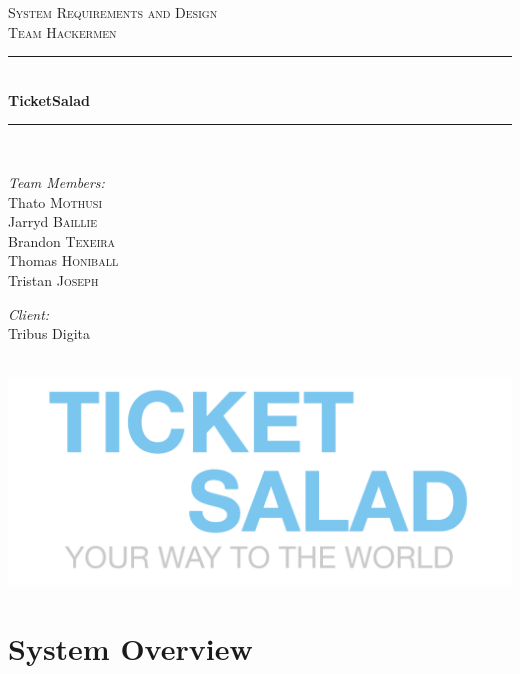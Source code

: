 \documentclass[11pt]{article}
\begin{document}
	\begin{titlepage}
		
		\newcommand{\HRule}{\rule{\linewidth}{0.5mm}} 
		
		\center 
		
		\textsc{\LARGE System Requirements and Design}\\[0.5cm] 
		\textsc{\Large Team Hackermen}\\[0.5cm] 
		
		\HRule \\[0.4cm]
		{ \huge \bfseries TicketSalad}\\[0.4cm] 
		\HRule \\[1.5cm]
		
		\begin{minipage}{0.4\textwidth}
			\begin{flushleft} \large
				\emph{Team Members:}\\
				Thato \textsc{Mothusi}\\
				Jarryd \textsc{Baillie}\\
				Brandon \textsc{Texeira}\\
				Thomas \textsc{Honiball}\\
				Tristan \textsc{Joseph}\\
			\end{flushleft}
		\end{minipage}
		
		\begin{minipage}{0.4\textwidth}
			\begin{flushright} \large
				\emph{Client:} \\
				Tribus Digita 
			\end{flushright}
		\end{minipage}\\[2cm]
		
		\includegraphics{logo.png}
		
	\end{titlepage}
	\newpage
	\tableofcontents
	\newpage
	\section{System Overview}
\end{document}
